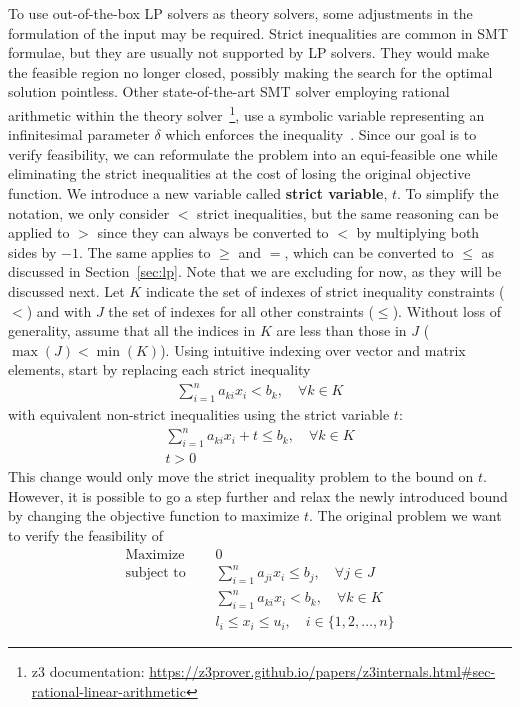 \documentclass[runningheads]{llncs}
\begin{document}
To use out-of-the-box LP solvers as theory solvers, some adjustments in the formulation of the input may be required.
Strict inequalities are common in SMT formulae, but they are usually not supported by LP solvers. They would make the feasible region no longer closed, possibly making the search for the optimal solution pointless.
Other state-of-the-art SMT solver employing rational arithmetic within the theory solver~\footnote{z3 documentation: \url{https://z3prover.github.io/papers/z3internals.html\#sec-rational-linear-arithmetic}}, use a symbolic variable representing an infinitesimal parameter $\delta$ which enforces the inequality~\cite{ref:lra-dpll-t}.
Since our goal is to verify feasibility, we can reformulate the problem into an equi-feasible one while eliminating the strict inequalities at the cost of losing the original objective function.
We introduce a new variable called \textbf{strict variable}, $t$.
To simplify the notation, we only consider $<$ strict inequalities, but the same reasoning can be applied to $>$ since they can always be converted to $<$ by multiplying both sides by $-1$.
The same applies to $\ge$ and $=$, which can be converted to $\le$ as discussed in Section~\ref{sec:lp}.
Note that we are excluding \nqcs for now, as they will be discussed next.
Let $K$ indicate the set of indexes of strict inequality constraints ($<$) and with $J$ the set of indexes for all other constraints ($\le$).
Without loss of generality, assume that all the indices in $K$ are less than those in $J$ ($\max(J) < \min(K)$).
Using intuitive indexing over vector and matrix elements, start by replacing each strict inequality
\begin{align*}
    \sum_{i=1}^{n} a_{ki}x_{i} < b_k, \quad \forall k \in K
\end{align*}
with equivalent non-strict inequalities using the strict variable $t$:
\begin{align*}
    \sum_{i=1}^{n} a_{ki}x_{i} + t \le b_k, \quad \forall k \in K \\
    t > 0
\end{align*}
This change would only move the strict inequality problem to the bound on $t$.
However, it is possible to go a step further and relax the newly introduced bound by changing the objective function to maximize $t$.
The original problem we want to verify the feasibility of
\begin{equation}
    \label{eq:lp-original}
    \begin{split}
        \text{Maximize }   \quad & 0                                                          \\
        \text{subject to } \quad & \sum_{i=1}^{n} a_{ji}x_{i} \le b_j,  \quad \forall j \in J \\
        \quad                    & \sum_{i=1}^{n} a_{ki}x_{i} < b_k,   \quad \forall k \in K  \\
        & l_i \le x_i \le u_i,  \quad i \in \{1, 2, \ldots, n\}
    \end{split}
\end{equation}
\end{document}
